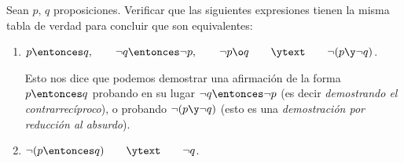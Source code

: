 \begin{enunciado}{\ejercicio}
  Sean $p,\, q$ proposiciones. Verificar que las siguientes expresiones tienen la misma tabla de verdad para
  concluir que son equivalentes:

  \begin{enumerate}[label=\roman*)]
          \item\label{10-1-i} $p \entonces q,
            \qquad
            \neg q \entonces \neg p, \qquad \neg p \o q \qquad \ytext \qquad  \neg (p \y \neg q)$.\par
          Esto nos dice que podemos demostrar una afirmación de la forma $p \entonces q$ probando en su lugar
          $\neg q \entonces \neg p$ (es decir \textit{demostrando el contrarrecíproco}), o probando $\neg (p \y \neg q)$ (esto
          es una \textit{demostración por reducción al absurdo}).

    \item $\neg(p \entonces q)\qquad \ytext \qquad \neg q$.
  \end{enumerate}
\end{enunciado}

